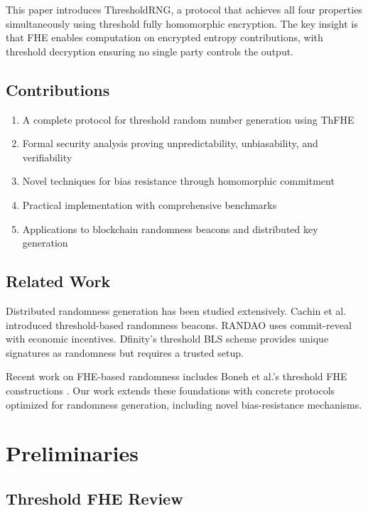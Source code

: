 \documentclass[11pt,a4paper]{article}
\begin{document}
This paper introduces ThresholdRNG, a protocol that achieves all four properties simultaneously using threshold fully homomorphic encryption. The key insight is that FHE enables computation on encrypted entropy contributions, with threshold decryption ensuring no single party controls the output.

\subsection{Contributions}

\begin{enumerate}
    \item A complete protocol for threshold random number generation using ThFHE
    \item Formal security analysis proving unpredictability, unbiasability, and verifiability
    \item Novel techniques for bias resistance through homomorphic commitment
    \item Practical implementation with comprehensive benchmarks
    \item Applications to blockchain randomness beacons and distributed key generation
\end{enumerate}

\subsection{Related Work}

Distributed randomness generation has been studied extensively. Cachin et al. \cite{cachin2005random} introduced threshold-based randomness beacons. RANDAO \cite{randao} uses commit-reveal with economic incentives. Dfinity's threshold BLS scheme \cite{dfinity2018threshold} provides unique signatures as randomness but requires a trusted setup.

Recent work on FHE-based randomness includes Boneh et al.'s threshold FHE constructions \cite{boneh2020single}. Our work extends these foundations with concrete protocols optimized for randomness generation, including novel bias-resistance mechanisms.

\section{Preliminaries}

\subsection{Threshold FHE Review}
\end{document}
